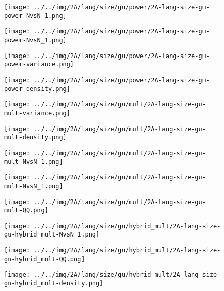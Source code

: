 \begin{figure}[H]
\centering	\texttt{[image: ../../img/2A/lang/size/gu/power/2A-lang-size-gu-power-NvsN-1.png]}
\end{figure}
\begin{figure}[H]
\centering	\texttt{[image: ../../img/2A/lang/size/gu/power/2A-lang-size-gu-power-NvsN\_1.png]}
\end{figure}
\begin{figure}[H]
\centering	\texttt{[image: ../../img/2A/lang/size/gu/power/2A-lang-size-gu-power-variance.png]}
\end{figure}
\begin{figure}[H]
\centering	\texttt{[image: ../../img/2A/lang/size/gu/power/2A-lang-size-gu-power-density.png]}
\end{figure}
\begin{figure}[H]
\centering	\texttt{[image: ../../img/2A/lang/size/gu/mult/2A-lang-size-gu-mult-variance.png]}
\end{figure}
\begin{figure}[H]
\centering	\texttt{[image: ../../img/2A/lang/size/gu/mult/2A-lang-size-gu-mult-density.png]}
\end{figure}
\begin{figure}[H]
\centering	\texttt{[image: ../../img/2A/lang/size/gu/mult/2A-lang-size-gu-mult-NvsN-1.png]}
\end{figure}
\begin{figure}[H]
\centering	\texttt{[image: ../../img/2A/lang/size/gu/mult/2A-lang-size-gu-mult-NvsN\_1.png]}
\end{figure}
\begin{figure}[H]
\centering	\texttt{[image: ../../img/2A/lang/size/gu/mult/2A-lang-size-gu-mult-QQ.png]}
\end{figure}
\begin{figure}[H]
\centering	\texttt{[image: ../../img/2A/lang/size/gu/hybrid\_mult/2A-lang-size-gu-hybrid\_mult-NvsN\_1.png]}
\end{figure}
\begin{figure}[H]
\centering	\texttt{[image: ../../img/2A/lang/size/gu/hybrid\_mult/2A-lang-size-gu-hybrid\_mult-QQ.png]}
\end{figure}
\begin{figure}[H]
\centering	\texttt{[image: ../../img/2A/lang/size/gu/hybrid\_mult/2A-lang-size-gu-hybrid\_mult-density.png]}
\end{figure}
